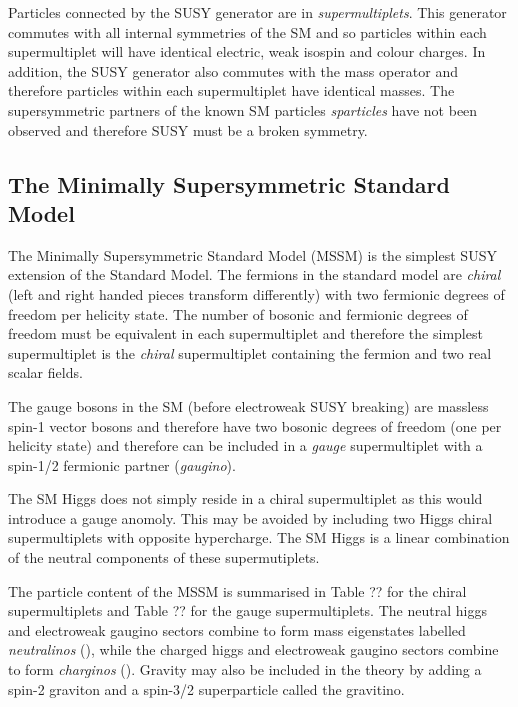 Particles connected by the SUSY generator are in \emph{supermultiplets}. This generator commutes with all internal symmetries 
of the SM and so particles within each supermultiplet will have identical electric, weak isospin and colour charges.
In addition, the SUSY generator also commutes with the mass operator and therefore 
particles within each supermultiplet have identical masses. The supersymmetric partners of the 
known SM particles \emph{sparticles} have not been observed and therefore SUSY must be a broken symmetry.

%

\subsection{The Minimally Supersymmetric Standard Model}

The Minimally Supersymmetric Standard Model (MSSM) is the simplest SUSY extension of the Standard Model.
The fermions in the standard model are \emph{chiral} (left and right handed pieces transform differently)
with two fermionic degrees of freedom per helicity state. The number of bosonic and fermionic degrees 
of freedom must be equivalent in each supermultiplet and therefore the simplest supermultiplet
is the \emph{chiral} supermultiplet containing the fermion and two real scalar fields.

The gauge bosons in the SM (before electroweak SUSY breaking) are massless spin-1 vector bosons
and therefore have two bosonic degrees of freedom (one per helicity state) and therefore
can be included in a \emph{gauge} supermultiplet with a spin-1/2 fermionic partner (\emph{gaugino}).

The SM Higgs does not simply reside in a chiral supermultiplet as this would introduce a 
gauge anomoly. This may be avoided by including two Higgs chiral supermultiplets with 
opposite hypercharge. The SM Higgs is a linear combination of the neutral components 
of these supermutiplets.

The particle content of the MSSM is summarised in Table ?? for the chiral supermultiplets
and Table ?? for the gauge supermultiplets. The neutral higgs and electroweak 
gaugino sectors combine to form mass eigenstates labelled \emph{neutralinos} 
(\chiz), while the charged higgs and electroweak gaugino sectors combine
to form \emph{charginos} (\chip). Gravity may also be included in the theory
by adding a spin-2 graviton and a spin-3/2 superparticle
called the gravitino. 

